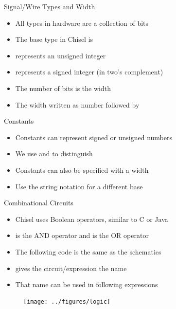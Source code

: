 \begin{frame}[fragile]{Signal/Wire Types and Width}
\begin{itemize}
\item All types in hardware are a collection of bits
\item The base type in Chisel is 
\item {} represents an unsigned integer
\item {} represents a signed integer (in two's complement)
\item The number of bits is the width
\item The width written as number followed by 
\end{itemize}
\end{frame}

\begin{frame}[fragile]{Constants}
\begin{itemize}
\item Constants can represent signed or unsigned numbers
\item We use  and  to distinguish
\end{itemize}
\begin{itemize}
\item Constants can also be specified with a width
\end{itemize}
\begin{itemize}
\item Use the string notation for a different base
\end{itemize}
\end{frame}

\begin{frame}[fragile]{Combinational Circuits}
\begin{itemize}
\item Chisel uses Boolean operators, similar to C or Java
\item \code{\&} is the AND operator and \code{|} is the OR operator
\item The following code is the same as the schematics
\item {} gives the circuit/expression the name 
\item That name can be used in following expressions
\end{itemize}
\begin{figure}
  \texttt{[image: ../figures/logic]}
\end{figure}
\end{frame}


